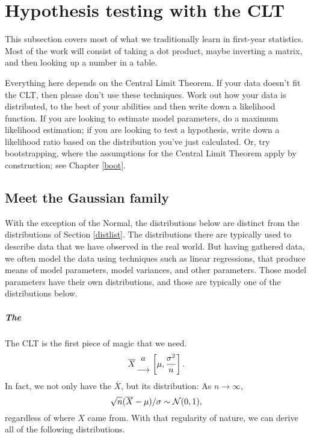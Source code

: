 \chapter[Gaussian tricks]{Hypothesis testing with the CLT} \label{gauss}

This subsection covers most of what we traditionally learn in first-year statistics. 
 Most of the work will consist of taking a dot product, maybe inverting a matrix,
and then looking up a number in a table. 

Everything here depends on the Central Limit Theorem. If your data doesn't
fit the CLT, then please don't use these techniques. Work out how your
data is distributed, to the best of your abilities 
and then write down a likelihood function. If you are
looking to estimate model parameters, do a maximum likelihood estimation;
if you are looking to test a hypothesis, write down a likelihood ratio
based on the distribution you've just calculated.
Or, try bootstrapping, where the assumptions for the Central Limit
Theorem apply by construction; see  Chapter \ref{boot}.  



\section{Meet the Gaussian family} \label{dist2}
With the exception of the Normal, the distributions below are distinct
from the distributions of Section \ref{distlist}. The distributions
there
are typically used to describe data that we have observed in the real
world. But having gathered data, we often model the data using techniques
such as linear regressions, that produce means of model parameters,
model variances, and other parameters. Those model parameters have their
own distributions, and those are typically one of the distributions below.


\paragraph{The } The CLT is the first piece of magic
that we need. 
$$\overline X {a \atop \longrightarrow} \left[\mu,{\sigma^2\over n}\right].$$
In fact, we not only have the $\overline X$, but its distribution:
As $n\to \infty$, $$\sqrt{n} (\overline X - \mu)/\sigma \sim {\cal N}(0,1),$$ 
regardless of where $X$ came from. With that regularity of nature,
we can derive all of the following distributions.  \label{CLT}

